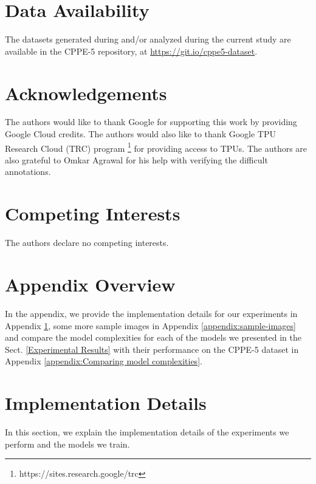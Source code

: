 \documentclass{article}
\begin{document}
\section*{Data Availability}
\label{Data Availability}

The datasets generated during and/or analyzed during the current study are available in the CPPE-5 repository, at \url{https://git.io/cppe5-dataset}.

\section*{Acknowledgements}
\label{Acknowledgements}

The authors would like to thank Google for supporting this work by providing Google Cloud credits. The authors would also like to thank Google TPU Research Cloud (TRC) program \footnote{https://sites.research.google/trc} for providing access to TPUs. The authors are also grateful to Omkar Agrawal for his help with verifying the difficult annotations.

\section*{Competing Interests}
The authors declare no competing interests.




\newpage

\section*{Appendix Overview}
\label{Appendix Overview}

In the appendix, we provide the implementation details for our experiments in Appendix \ref{Implementation Details}, some more sample images in Appendix \ref{appendix:sample-images} and compare the model complexities for each of the models we presented in the Sect. \ref{Experimental Results} with their performance on the CPPE-5 dataset in Appendix \ref{appendix:Comparing model complexities}.

\appendix

\section{Implementation Details}
\label{Implementation Details}

In this section, we explain the implementation details of the experiments we perform and the models we train.
\end{document}
